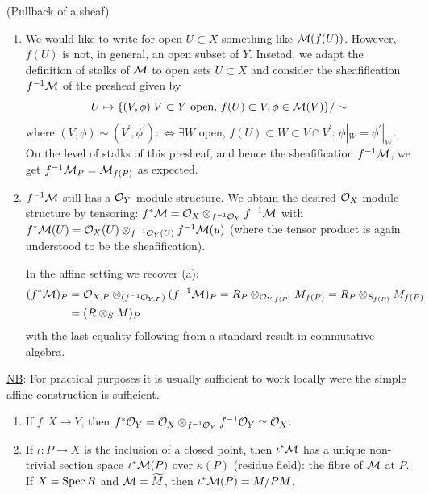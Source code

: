 \documentclass[a4paper,11pt]{article}
\begin{document}
			
			\begin{defi}\label{def--pullback-sheaves}(Pullback of a sheaf)
				\begin{enumerate}
					\item We would like to write for open $U\subset X$ something like $\mathcal{M}(f(U))$. However, $f(U)$ is not, in general, an open subset of $Y$. Insetad, we adapt the definition of stalks of $\mathcal{M}$ to open sets $U\subset X$ and consider the sheafification $f^{-1}\mathcal{M}$ of the presheaf given by 
						\begin{equation*}
							U\mapsto\{(V,\phi)|V\subset Y\text{ open, }f(U)\subset V,\phi\in\mathcal{M}(V)\}/\sim
						\end{equation*}
						where $(V,\phi)\sim(V^\prime,\phi^\prime):\Longleftrightarrow\exists W$ open, $f(U)\subset W\subset V\cap V^\prime$: $\phi|_W=\phi^\prime|_W$. On the level of stalks of this presheaf, and hence the sheafification $f^{-1}\mathcal{M}$, we get $f^{-1}\mathcal{M}_P=\mathcal{M}_{f(P)}$ as expected. 
					\item $f^{-1}\mathcal{M}$ still has a $\mathcal{O}_Y$-module structure. We obtain the desired $\mathcal{O}_X$-module structure by tensoring: $f^\ast\mathcal{M}=\mathcal{O}_X\otimes_{f^{-1}\mathcal{O}_Y}f^{-1}\mathcal{M}$ with $f^\ast\mathcal{M}(U)=\mathcal{O}_X(U)\otimes_{f^{-1}\mathcal{O}_Y(U)}f^{-1}\mathcal{M}(u)$ (where the tensor product is again understood to be the sheafification).
					
					In the affine setting we recover (a): 
					\begin{align*}
						(f^\ast\mathcal{M})_P&=\mathcal{O}_{X,P}\otimes_{(f^{-1}\mathcal{O}_{Y,P})}(f^{-1}\mathcal{M})_P=R_P\otimes_{\mathcal{O}_{Y,f(P)}}M_{f(P)}=R_P\otimes_{S_{f(P)}}M_{f(P)}\\
						&=(R\otimes_SM)_P
					\end{align*}
					with the last equality following from a standard result in commutative algebra.
				\end{enumerate}
			\end{defi}

			\noindent\underline{NB}: For practical purposes it is usually sufficient to work locally were the simple affine construction is sufficient.

			\begin{eg}
				\begin{enumerate}
					\item If $f:X\rightarrow Y$, then $f^\ast\mathcal{O}_Y=\mathcal{O}_X\otimes_{f^{-1}\mathcal{O}_Y}f^{-1}\mathcal{O}_Y\simeq\mathcal{O}_X$.
					\item If $\iota:P\rightarrow X$ is the inclusion of a closed point, then $\iota^\ast\mathcal{M}$ has a unique non-trivial section space $\iota^\ast\mathcal{M}(P)$ over $\kappa(P)$ (residue field): the fibre of $\mathcal{M}$ at $P$. If $X=\operatorname{Spec} R$ and $\mathcal{M}=\widetilde{M}$, then $\iota^\ast\mathcal{M}(P)=M/PM$.
				\end{enumerate}
			\end{eg}
\end{document}
